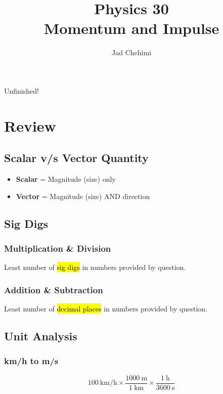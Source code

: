 \documentclass[a4paper,12pt]{article}
\title{Physics 30 \\ Momentum and Impulse}
\author{Jad Chehimi}
\begin{document}
\maketitle


\begin{center}
\Huge
Unfinished!
\normalsize
\end{center}

\tableofcontents

\pagebreak

\section{Review}
\subsection{Scalar v/s Vector Quantity}
\begin{itemize}
    \item{\textbf{Scalar} = Magnitude (size) only}
    \item{\textbf{Vector} = Magnitude (size) AND direction}
\end{itemize}

\subsection{Sig Digs}
\subsubsection{Multiplication \& Division}
Least number of \hl{sig digs} in numbers provided by question.

\subsubsection{Addition \& Subtraction}
Least number of \hl{decimal places} in numbers provided by question.

\subsection{Unit Analysis}
\subsubsection{km/h to m/s}
$$\SI{100}{\km/\hour} \times \frac{\SI{1000}{\m}}{\SI{1}{\km}} \times \frac{\SI{1}{\hour}}{\SI{3600}{\second}}$$
\end{document}
